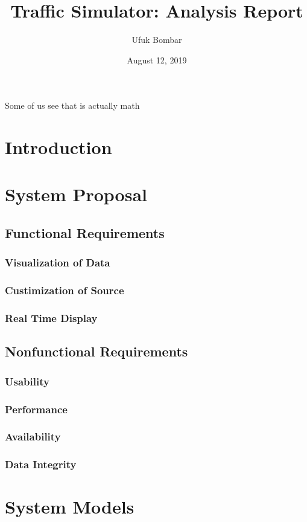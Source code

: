 \documentclass[a4paper, 12pt]{article}
\title{Traffic Simulator: Analysis Report}
\date{August 12, 2019}
\author{Ufuk Bombar}
\begin{document}
    \maketitle
    \newpage
    \tableofcontents
    \newpage

    Some of us see that \autocite{mybook} is actually \gls{math}

    \section{Introduction}
    \section{System Proposal}
        \subsection{Functional Requirements}
            \subsubsection{Visualization of Data}
            \subsubsection{Custimization of Source}
            \subsubsection{Real Time Display}
        \subsection{Nonfunctional Requirements}
            \subsubsection{Usability}
            \subsubsection{Performance}
            \subsubsection{Availability}
            \subsubsection{Data Integrity}
    \section{System Models}

    \printnoidxglossaries

    \printbibliography[
        heading=bibnumbered,
        title={References}]
    
\end{document}

